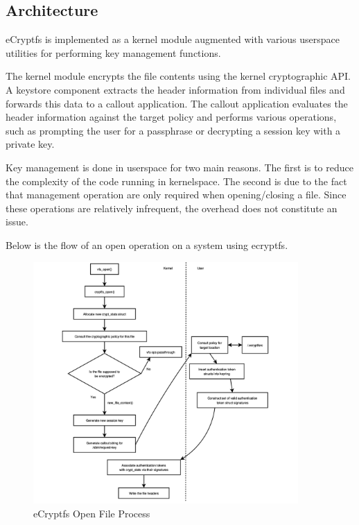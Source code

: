 \subsection{Architecture}
\label{sub-sec:arch-ecryptfs}

eCryptfs is implemented as a kernel module augmented with various userspace utilities for performing key management functions.


The kernel module encrypts the file contents using the kernel cryptographic API. A keystore component extracts the header information from individual files and forwards this data to a callout application. The callout application evaluates the header information against the target policy and performs various operations, such as prompting the user for a passphrase or decrypting a session key with a private key.

Key management is done in userspace for two main reasons. The first is to reduce the complexity of the code running in kernelspace. The second is due to the fact that management operation are only required when opening/closing a file. Since these operations are relatively infrequent, the overhead does not constitute an issue.

Below is the flow of an open operation on a system using ecryptfs.

\begin{figure}[h!]
\centering
    \includegraphics[width=0.9\textwidth]{src/img/ecryptfs/newfile.png}
\caption{eCryptfs Open File Process}
\end{figure}


